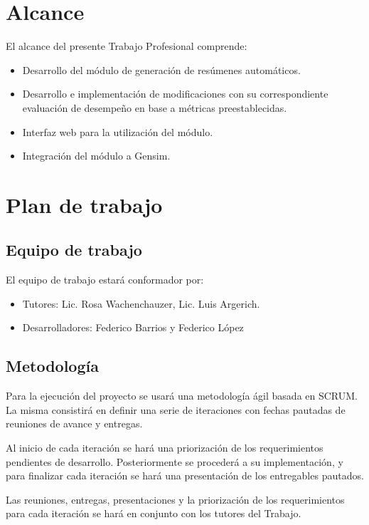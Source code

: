 \documentclass[12pt,a4paper]{article}
\begin{document}
\section{Alcance}

El alcance del presente Trabajo Profesional comprende:
\begin{itemize}
    \item Desarrollo del módulo de generación de resúmenes automáticos.
    \item Desarrollo e implementación de modificaciones con su correspondiente 
evaluación de desempeño en base a métricas preestablecidas.
    \item Interfaz web para la utilización del módulo.
    \item Integración del módulo a Gensim.
\end{itemize}


\section{Plan de trabajo}
\subsection{Equipo de trabajo}

El equipo de trabajo estará conformador por:
\begin{itemize}
    \item Tutores: Lic. Rosa Wachenchauzer, Lic. Luis Argerich.
    \item Desarrolladores: Federico Barrios y Federico López
\end{itemize}

\subsection{Metodología}
Para la ejecución del proyecto se usará una metodología ágil basada en SCRUM. 
La misma consistirá en definir una serie de iteraciones con fechas pautadas de 
reuniones de avance y entregas. 

Al inicio de cada iteración se hará una priorización de los requerimientos 
pendientes de desarrollo. Posteriormente se procederá a su implementación, y 
para finalizar cada iteración se hará una presentación de los entregables 
pautados.

Las reuniones, entregas, presentaciones y la priorización de los requerimientos 
para cada iteración se hará en conjunto con los tutores del Trabajo.
\end{document}
